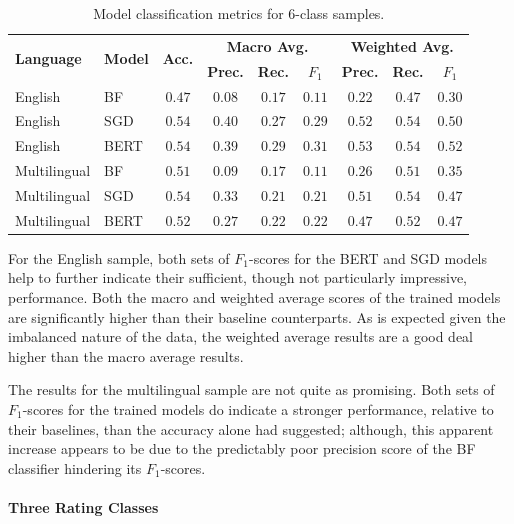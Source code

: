 \begin{table}[ht]
    \centering
    \begin{tabular}{l l | c | c c c | c c c}
        \toprule
        \multirow{2}{*}{\textbf{Language}}&\multirow{2}{*}{\textbf{Model}}&\multirow{2}{*}{\textbf{Acc.}}&\multicolumn{3}{c}{\textbf{Macro Avg.}}&\multicolumn{3}{|c}{\textbf{Weighted Avg.}}\\
        &&&\textbf{Prec.} & \textbf{Rec.} & \textbf{$F_1$} & \textbf{Prec.} & \textbf{Rec.} & \textbf{$F_1$}\\\midrule
        English&BF&$0.47$&$0.08$&$0.17$&$0.11$&$0.22$&$0.47$&$0.30$\\
        English&SGD&$0.54$&$0.40$&$0.27$&$0.29$&$0.52$&$0.54$&$0.50$\\
        English&BERT&$\mathbf{0.54}$&$0.39$&$0.29$&$\mathbf{0.31}$&$0.53$&$0.54$&$\mathbf{0.52}$\\\midrule
        Multilingual&BF&$0.51$&$0.09$&$0.17$&$0.11$&$0.26$&$0.51$&$0.35$\\
        Multilingual&SGD&$\mathbf{0.54}$&$0.33$&$0.21$&$0.21$&$0.51$&$0.54$&$\mathbf{0.47}$\\
        Multilingual&BERT&$0.52$&$0.27$&$0.22$&$\mathbf{0.22}$&$0.47$&$0.52$&$0.47$\\
        \bottomrule
    \end{tabular}
    \caption{Model classification metrics for 6-class samples.}
    \label{tab:Res_PU_Metric6}
\end{table}

For the English sample, both sets of $F_1$-scores for the BERT and SGD models help to further indicate their sufficient, though not particularly impressive, performance. Both the macro and weighted average scores of the trained models are significantly higher than their baseline counterparts. As is expected given the imbalanced nature of the data, the weighted average results are a good deal higher than the macro average results.

The results for the multilingual sample are not quite as promising. Both sets of $F_1$-scores for the trained models do indicate a stronger performance, relative to their baselines, than the accuracy alone had suggested; although, this apparent increase appears to be due to the predictably poor precision score of the BF classifier hindering its $F_1$-scores.

\paragraph{Three Rating Classes}

